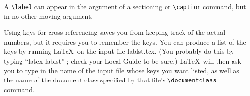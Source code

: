 \documentclass{article}
\newcommand{\justtext}[1]{\texttt{\textbackslash #1}}
\begin{document}
A \justtext{label} can appear in the argument of a sectioning or \justtext{caption} command, but in
no other moving argument.

Using keys for cross-referencing saves you from keeping track of the actual numbers, but it requires
you to remember the keys. You can produce a list of the keys by running \LaTeX\ on the input file
lablst.tex. (You probably do this by typing ``latex lablst'' ; check your Local Guide to be
sure.) \LaTeX\ will then ask you to type in the name of the input file whose keys you want listed,
as well as the name of the document class specified by that file's \justtext{documentclass} command.




\end{document}
